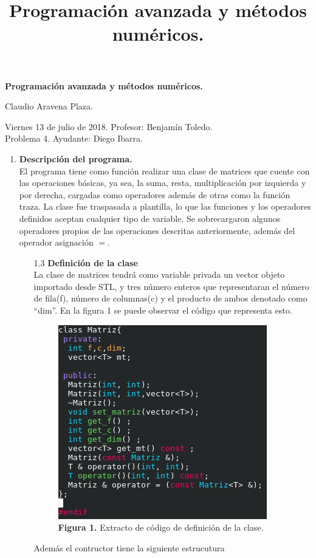 \documentclass[10pt,letterpaper]{article}
\author{}
\title{Programación avanzada y métodos numéricos.}
\date{}
\begin{document}
 \begin{center}
 \LARGE {\textbf{Programación avanzada y métodos numéricos.}}\\
 \end{center}
 \begin{center}
 Claudio Aravena Plaza. 
 \end{center}
 Viernes 13 de julio de 2018. \hfill Profesor: Benjamín Toledo. \\
 Problema 4. \hfill Ayudante: Diego Ibarra. \\
 
 
 
 
 \begin{enumerate}
\item \textbf{Descripción del programa.}\vspace{0.3cm}\\
\small El programa tiene como función realizar una clase de matrices que cuente con las operaciones básicas, ya sea, la suma, resta, multiplicación por izquierda y por derecha, cargadas como operadores además de otras como la función traza. La clase fue traspasada a plantilla, lo que las funciones y los operadores definidos aceptan cualquier tipo de variable. Se sobrecargaron algunos operadores propios de las operaciones descritas anteriormente, además del operador asignación $=$. 

\begin{enumerate}
\item[1.3]\textbf{Definición de la clase}\\
\small La clase de matrices tendrá como variable privada un vector objeto importado desde STL, y tres número enteros que representaran el número de fila(f), número de columnas(c) y el producto de ambos denotado como ``dim''. En la figura 1 se puede observar el código que representa esto.

\begin{figure}[H]
\begin{center}
\includegraphics[scale=0.4]{definicion_clase}\\
\textbf{Figura 1.} Extracto de código de definición de la clase. 
\end{center}
\end{figure}
Además el contructor tiene la siguiente estrucutura 


\end{enumerate}
\end{enumerate}
\end{document}
